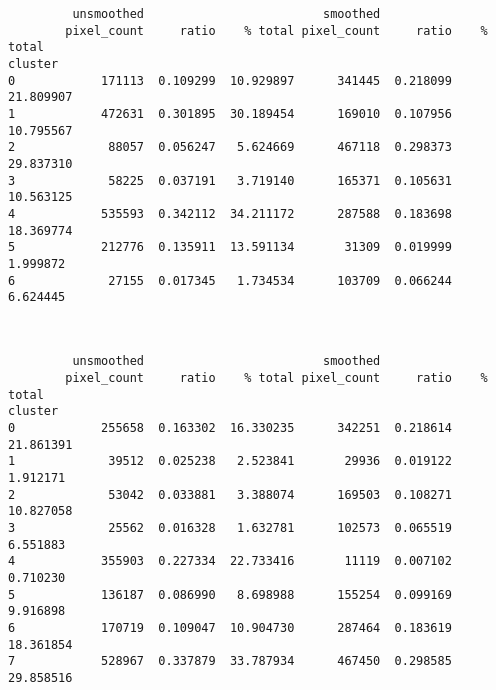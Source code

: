 \documentclass[11pt]{article}
\begin{document}
    
    \begin{verbatim}
         unsmoothed                         smoothed                     
        pixel_count     ratio    % total pixel_count     ratio    % total
cluster                                                                  
0            171113  0.109299  10.929897      341445  0.218099  21.809907
1            472631  0.301895  30.189454      169010  0.107956  10.795567
2             88057  0.056247   5.624669      467118  0.298373  29.837310
3             58225  0.037191   3.719140      165371  0.105631  10.563125
4            535593  0.342112  34.211172      287588  0.183698  18.369774
5            212776  0.135911  13.591134       31309  0.019999   1.999872
6             27155  0.017345   1.734534      103709  0.066244   6.624445
    \end{verbatim}

    
    \begin{center}
    \end{center}
    { \hspace*{\fill} \\}
    
    
    \begin{verbatim}
         unsmoothed                         smoothed                     
        pixel_count     ratio    % total pixel_count     ratio    % total
cluster                                                                  
0            255658  0.163302  16.330235      342251  0.218614  21.861391
1             39512  0.025238   2.523841       29936  0.019122   1.912171
2             53042  0.033881   3.388074      169503  0.108271  10.827058
3             25562  0.016328   1.632781      102573  0.065519   6.551883
4            355903  0.227334  22.733416       11119  0.007102   0.710230
5            136187  0.086990   8.698988      155254  0.099169   9.916898
6            170719  0.109047  10.904730      287464  0.183619  18.361854
7            528967  0.337879  33.787934      467450  0.298585  29.858516
    \end{verbatim}

    
    \begin{center}
    \end{center}
    { \hspace*{\fill} \\}
    
\end{document}
